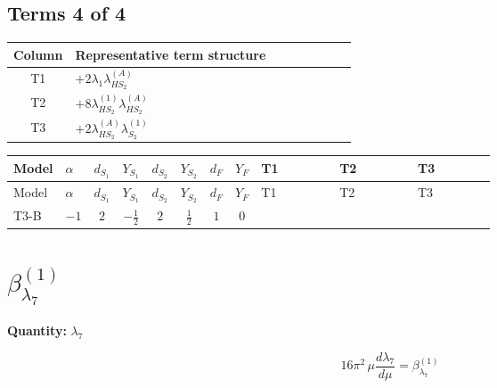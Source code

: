 \documentclass[8pt]{article}
\begin{document}
\begin{landscape}
\subsection*{Terms 4 of 4}
\begin{center}
\begin{tabular}{@{}c >{\raggedright\arraybackslash}p{0.82\linewidth}@{}}
\toprule
Column & Representative term structure \\
\midrule
T1 & \(\displaystyle +2 {\lambda_1} {\lambda_{HS_2}^{(A)}}\) \\
\midrule
T2 & \(\displaystyle +8 {\lambda_{HS_2}^{(1)}} {\lambda_{HS_2}^{(A)}}\) \\
\midrule
T3 & \(\displaystyle +2 {\lambda_{HS_2}^{(A)}} {\lambda_{S_2}^{(1)}}\) \\
\midrule
\bottomrule
\end{tabular}
\end{center}
\smallskip
\tiny
\begin{longtable}{@{}llcccccc >{\raggedright\arraybackslash}p{0.21\linewidth} >{\raggedright\arraybackslash}p{0.21\linewidth} >{\raggedright\arraybackslash}p{0.21\linewidth}@{}}
\toprule
Model & $\alpha$ & $d_{S_1}$ & $Y_{S_1}$ & $d_{S_2}$ & $Y_{S_2}$ & $d_F$ & $Y_F$ & T1 & T2 & T3 \\
\midrule
\endfirsthead
\toprule
Model & $\alpha$ & $d_{S_1}$ & $Y_{S_1}$ & $d_{S_2}$ & $Y_{S_2}$ & $d_F$ & $Y_F$ & T1 & T2 & T3 \\
\midrule
\endhead
T3-B & $-1$ & $2$ & $-\frac{1}{2}$ & $2$ & $\frac{1}{2}$ & $1$ & $0$ & \scriptsize\adjustbox{max width=\linewidth}{$\begin{gathered} +2 {\lambda_1} {\lambda_{HS_2}^{(A)}}\end{gathered}$} & \scriptsize\adjustbox{max width=\linewidth}{$\begin{gathered} +8 {\lambda_{HS_2}^{(1)}} {\lambda_{HS_2}^{(A)}}\end{gathered}$} & \scriptsize\adjustbox{max width=\linewidth}{$\begin{gathered} +2 {\lambda_{HS_2}^{(A)}} {\lambda_{S_2}^{(1)}}\end{gathered}$} \\
\midrule
\bottomrule
\end{longtable}
\clearpage
\section*{$\beta_{\lambda_{7}}^{(1)}$}
\noindent\textbf{Quantity: }$\lambda_{7}$\par\smallskip
\[16\pi^2\,\mu\frac{d \lambda_{7}}{d\mu}=\beta_{\lambda_{7}}^{(1)}\]

\end{landscape}
\end{document}
